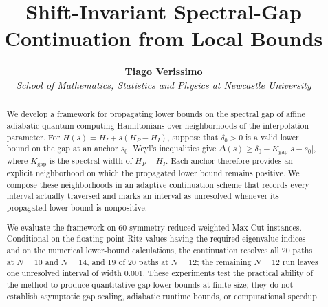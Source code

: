 \documentclass[11pt, a4paper]{article}
\title{\textbf{Shift-Invariant Spectral-Gap Continuation from Local Bounds}}
\author{
  \textbf{Tiago Verissimo}\\
  \small \textit{School of Mathematics, Statistics and Physics at Newcastle University} \\
}
\date{}
\begin{document}
\maketitle

\begin{abstract}
We develop a framework for propagating lower bounds on the spectral gap of affine adiabatic quantum-computing Hamiltonians over neighborhoods of the interpolation parameter. For $H(s)=H_I+s(H_P-H_I)$, suppose that $\delta_0>0$ is a valid lower bound on the gap at an anchor $s_0$. Weyl's inequalities give $\Delta(s)\ge \delta_0-K_{\mathrm{gap}}|s-s_0|$, where $K_{\mathrm{gap}}$ is the spectral width of $H_P-H_I$. Each anchor therefore provides an explicit neighborhood on which the propagated lower bound remains positive. We compose these neighborhoods in an adaptive continuation scheme that records every interval actually traversed and marks an interval as unresolved whenever its propagated lower bound is nonpositive.

We evaluate the framework on 60 symmetry-reduced weighted Max-Cut instances. Conditional on the floating-point Ritz values having the required eigenvalue indices and on the numerical lower-bound calculations, the continuation resolves all 20 paths at $N=10$ and $N=14$, and 19 of 20 paths at $N=12$; the remaining $N=12$ run leaves one unresolved interval of width $0.001$. These experiments test the practical ability of the method to produce quantitative gap lower bounds at finite size; they do not establish asymptotic gap scaling, adiabatic runtime bounds, or computational speedup.
\end{abstract}

\tableofcontents
\end{document}
